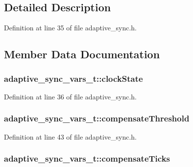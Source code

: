 \subsection{Detailed Description}


Definition at line 35 of file adaptive\+\_\+sync.\+h.



\subsection{Member Data Documentation}
\subsubsection[{\texorpdfstring{clock\+State}{clockState}}]{ adaptive\+\_\+sync\+\_\+vars\+\_\+t\+::clock\+State}\hypertarget{structadaptive__sync__vars__t_a03b60b176b1c36cef8973c0809475b8c}{}\label{structadaptive__sync__vars__t_a03b60b176b1c36cef8973c0809475b8c}


Definition at line 36 of file adaptive\+\_\+sync.\+h.

\subsubsection[{\texorpdfstring{compensate\+Threshold}{compensateThreshold}}]{ adaptive\+\_\+sync\+\_\+vars\+\_\+t\+::compensate\+Threshold}\hypertarget{structadaptive__sync__vars__t_aa909a2de7eb3c6c5c2e1a985c1ab9c3d}{}\label{structadaptive__sync__vars__t_aa909a2de7eb3c6c5c2e1a985c1ab9c3d}


Definition at line 43 of file adaptive\+\_\+sync.\+h.

\subsubsection[{\texorpdfstring{compensate\+Ticks}{compensateTicks}}]{ adaptive\+\_\+sync\+\_\+vars\+\_\+t\+::compensate\+Ticks}\hypertarget{structadaptive__sync__vars__t_a72004ac5906fa534177c6e3af8c7d42c}{}\label{structadaptive__sync__vars__t_a72004ac5906fa534177c6e3af8c7d42c}


